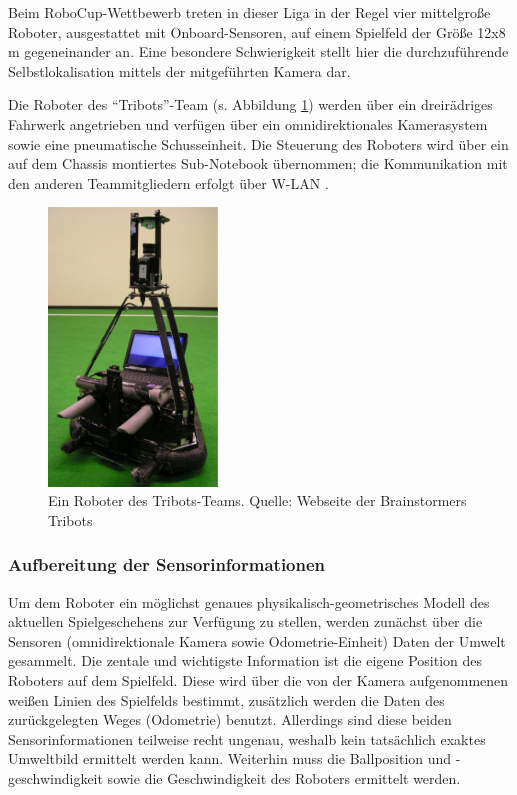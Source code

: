 Beim RoboCup-Wettbewerb treten in dieser Liga in der Regel vier mittelgroße 
Roboter, ausgestattet mit Onboard-Sensoren, auf einem Spielfeld der Größe 
12x8\,m gegeneinander an. Eine besondere Schwierigkeit stellt hier die 
durchzuführende Selbstlokalisation mittels der mitgeführten Kamera dar.

Die Roboter des "`Tribots"'-Team (s. Abbildung \ref{fig:tribots-roboter}) 
werden über ein dreirädriges Fahrwerk angetrieben und verfügen über ein 
omnidirektionales Kamerasystem sowie eine pneumatische Schusseinheit. Die 
Steuerung des Roboters wird über ein auf dem Chassis montiertes Sub-Notebook 
übernommen; die Kommunikation mit den anderen Teammitgliedern erfolgt über 
W-LAN \cite{url:Tribots2006}.

\begin{figure}
  \centering
  \includegraphics[width=0.40\textwidth]{../images/tribots-roboter}
  \caption{Ein Roboter des Tribots-Teams. Quelle: Webseite der Brainstormers Tribots}
  \label{fig:tribots-roboter}
\end{figure}

\subsubsection{Aufbereitung der Sensorinformationen}
Um dem Roboter ein möglichst genaues physikalisch-geometrisches Modell des 
aktuellen Spielgeschehens zur Verfügung zu stellen, werden zunächst über die 
Sensoren (omnidirektionale Kamera sowie Odometrie-Einheit) Daten der Umwelt 
gesammelt. Die zentale und wichtigste Information ist die eigene Position des 
Roboters auf dem Spielfeld. Diese wird über die von der Kamera aufgenommenen 
weißen Linien des Spielfelds bestimmt, zusätzlich werden die Daten des 
zurückgelegten Weges (Odometrie) benutzt. Allerdings sind diese beiden 
Sensorinformationen teilweise recht ungenau, weshalb kein tatsächlich exaktes 
Umweltbild ermittelt werden kann. Weiterhin muss die Ballposition und 
-geschwindigkeit sowie die Geschwindigkeit des Roboters ermittelt werden.

